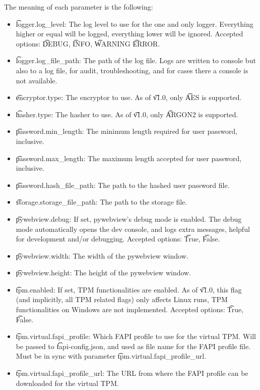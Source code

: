 The meaning of each parameter is the following:
\begin{itemize}
  \item \t{logger.log\_level}:
    The log level to use for the one and only logger.
    Everything higher or equal will be logged, everything lower will be ignored.
    Accepted options: \t{DEBUG}, \t{INFO}, \t{WARNING} \t{ERROR}.
  \item \t{{logger.log\_file\_path}}:
    The path of the log file.
    Logs are written to console but also to a log file, for audit, troubleshooting, and for cases there a console is not available.
  \item \t{encryptor.type}:
    The encryptor to use.
    As of \t{v1.0}, only \t{AES} is supported.
  \item \t{hasher.type}:
    The hasher to use.
    As of \t{v1.0}, only \t{ARGON2} is supported.
  \item \t{password.min\_length}:
    The minimum length required for user password, inclusive.
  \item \t{password.max\_length}:
    The maximum length accepted for user password, inclusive.
  \item \t{password.hash\_file\_path}:
    The path to the hashed user password file. 
  \item \t{storage.storage\_file\_path}:
    The path to the storage file.
  \item \t{pywebview.debug}:
    If set, pywebview's debug mode is enabled.
    The debug mode automatically opens the dev console, and logs extra messages, helpful for development and/or debugging.
    Accepted options: \t{True}, \t{False}.
  \item \t{pywebview.width}:
    The width of the pywebview window.
  \item \t{pywebview.height}:
    The height of the pywebview window.
  \item \t{tpm.enabled}:
    If set, TPM functionalities are enabled.
    As of \t{v1.0}, this flag (and implicitly, all TPM related flags) only affects Linux runs, TPM functionalities on Windows are not implemented.
    Accepted options: \t{True}, \t{False}.
  \item \t{tpm.virtual.fapi\_profile}:
    Which FAPI profile to use for the virtual TPM.
    Will be passed to \t{fapi-config.json}, and used as file name for the FAPI profile file.
    Must be in sync with parameter \t{tpm.virtual.fapi\_profile\_url}.
  \item \t{tpm.virtual.fapi\_profile\_url}:
    The URL from where the FAPI profile can be downloaded for the virtual TPM.

\end{itemize}
